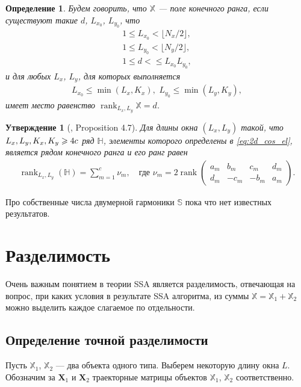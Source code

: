 \documentclass[specialist,
               substylefile = spbu.rtx,
               subf,href,colorlinks=true, 12pt]{disser}
\def\rank{\mathop{\mathrm{rank}}}
\newtheorem{defn}{Определение}
\newtheorem{Th}{Утверждение}
\begin{document}
\begin{defn}
Будем говорить, что $\mathbb{X}$ --- \emph{поле конечного ранга}, если существуют такие $d$, $L_{x_0}$, $L_{y_0}$, что 
\begin{gather*}
1 \leqslant L_{x_0} < \lfloor N_x/2 \rfloor, \\
1 \leqslant L_{y_0} < \lfloor N_y/2 \rfloor, \\
1 \leqslant d <\leqslant L_{x_0} L_{y_0}, 
\end{gather*} 
и для любых $L_x$, $L_y$, для которых выполняется 
\begin{gather*}
L_{x_0} \leqslant \min(L_x,K_x), \,\, L_{y_0} \leqslant \min(L_y,K_y),
\end{gather*} 
имеет место равенство $\rank_{L_x, L_y}{\mathbb{X}} = d$.
\end{defn}

\begin{Th}[\cite{Golyandina.Usevich2010}, Proposition 4.7] \label{th:2d_rank_cos}
Для длины окна $(L_x, L_y)$ такой, что $L_x, L_y, K_x, \\K_y \geqslant 4c$ ряд $\mathbb{H}$, элементы которого определены в \eqref{eq:2d_cos_el}, является рядом конечного ранга и его ранг равен
\begin{gather*}
\rank_{L_x, L_y}(\mathbb{H}) = \sum_{m=1}^{c}{\nu_m}, \quad \text{где } \nu_m=2\rank
 \left(
  \begin{matrix}
a_m &b_m &c_m &d_m \\
d_m &-c_m &-b_m &a_m
\end{matrix}
\right).
\end{gather*}
\end{Th}

Про собственные числа двумерной гармоники $\mathbb{S}$ пока что нет известных результатов.

\section{Разделимость}
\label{sec:separability}
Очень важным понятием в теории SSA является разделимость, отвечающая на вопрос, при каких условия в результате SSA алгоритма, из суммы $\mathbb{X} = \mathbb{X}_1 + \mathbb{X}_2$ можно выделить каждое слагаемое по отдельности.

\subsection{Определение точной разделимости}
Пусть  $\mathbb{X}_1$,  $\mathbb{X}_2$ --- два объекта одного типа. Выберем некоторую длину окна $L$. Обозначим за $\mathbf{X}_1$  и  $\mathbf{X}_2$ траекторные матрицы объектов $\mathbb{X}_1$,  $\mathbb{X}_2$ соответственно.
\end{document}
